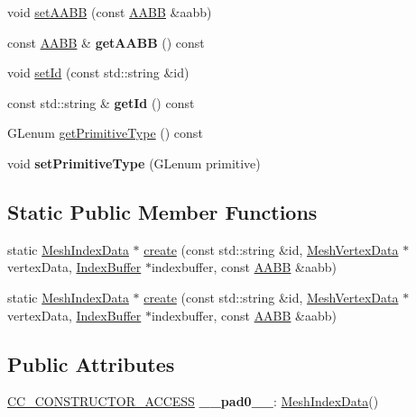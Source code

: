 \begin{DoxyCompactItemize}
\item 
void \hyperlink{classMeshIndexData_a20756e29720a84945cae48decb15c7fa}{set\+A\+A\+BB} (const \hyperlink{classAABB}{A\+A\+BB} \&aabb)
\item 
\mbox{\label{classMeshIndexData_a2586f3fc18289e290e9b2ad40d76bbf8}} 
const \hyperlink{classAABB}{A\+A\+BB} \& {\bfseries get\+A\+A\+BB} () const
\item 
void \hyperlink{classMeshIndexData_a9ad0c017805d1340f39eace9dab6b758}{set\+Id} (const std\+::string \&id)
\item 
\mbox{\label{classMeshIndexData_ad95d1e4400fca6ba940f275e5837fc8c}} 
const std\+::string \& {\bfseries get\+Id} () const
\item 
G\+Lenum \hyperlink{classMeshIndexData_ab5861ae0ec258b50381b8ff4b3e6719d}{get\+Primitive\+Type} () const
\item 
\mbox{\label{classMeshIndexData_af0f414abe597445d480b37f2eedc16c7}} 
void {\bfseries set\+Primitive\+Type} (G\+Lenum primitive)
\end{DoxyCompactItemize}
\subsection*{Static Public Member Functions}
\begin{DoxyCompactItemize}
\item 
static \hyperlink{classMeshIndexData}{Mesh\+Index\+Data} $\ast$ \hyperlink{classMeshIndexData_a33afee4a14d23cab7320289eb98eca28}{create} (const std\+::string \&id, \hyperlink{classMeshVertexData}{Mesh\+Vertex\+Data} $\ast$vertex\+Data, \hyperlink{classIndexBuffer}{Index\+Buffer} $\ast$indexbuffer, const \hyperlink{classAABB}{A\+A\+BB} \&aabb)
\item 
static \hyperlink{classMeshIndexData}{Mesh\+Index\+Data} $\ast$ \hyperlink{classMeshIndexData_a6a4dee3401b8f514b48fd98b6261830a}{create} (const std\+::string \&id, \hyperlink{classMeshVertexData}{Mesh\+Vertex\+Data} $\ast$vertex\+Data, \hyperlink{classIndexBuffer}{Index\+Buffer} $\ast$indexbuffer, const \hyperlink{classAABB}{A\+A\+BB} \&aabb)
\end{DoxyCompactItemize}
\subsection*{Public Attributes}
\begin{DoxyCompactItemize}
\item 
\mbox{\label{classMeshIndexData_a13edc375512a51a0b2cae222f5e5c556}} 
\hyperlink{_2cocos2d_2cocos_2base_2ccConfig_8h_a25ef1314f97c35a2ed3d029b0ead6da0}{C\+C\+\_\+\+C\+O\+N\+S\+T\+R\+U\+C\+T\+O\+R\+\_\+\+A\+C\+C\+E\+SS} {\bfseries \+\_\+\+\_\+pad0\+\_\+\+\_\+}\+: \hyperlink{classMeshIndexData}{Mesh\+Index\+Data}()
\end{DoxyCompactItemize}
